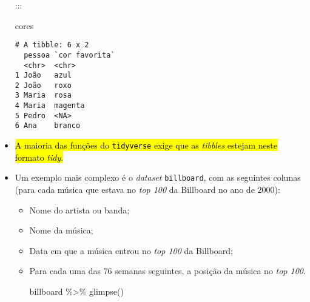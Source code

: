 \documentclass[
  letterpaper,
  DIV=11,
  numbers=noendperiod]{scrreprt}
\newenvironment{Shaded}{\begin{snugshade}}{\end{snugshade}}
\newcommand{\FunctionTok}[1]{\textcolor[rgb]{0.28,0.35,0.67}{#1}}
\newcommand{\NormalTok}[1]{\textcolor[rgb]{0.00,0.23,0.31}{#1}}
\newcommand{\SpecialCharTok}[1]{\textcolor[rgb]{0.37,0.37,0.37}{#1}}
\begin{document}
\begin{itemize}
  :::

\begin{Shaded}
\begin{Highlighting}[]
\NormalTok{cores}
\end{Highlighting}
\end{Shaded}

\begin{verbatim}
# A tibble: 6 x 2
  pessoa `cor favorita`
  <chr>  <chr>         
1 João   azul          
2 João   roxo          
3 Maria  rosa          
4 Maria  magenta       
5 Pedro  <NA>          
6 Ana    branco        
\end{verbatim}
\item
  {\hl{A maioria das funções do {\mbox{\texttt{tidyverse}}} exige que as
  \emph{tibbles} estejam neste formato \emph{tidy}.}}
\item
  Um exemplo mais complexo é o \emph{dataset} \texttt{billboard}, com as
  seguintes colunas (para cada música que estava no \emph{top 100} da
  Billboard no ano de $2000$):

  \begin{itemize}
  \item
    Nome do artista ou banda;
  \item
    Nome da música;
  \item
    Data em que a música entrou no \emph{top 100} da Billboard;
  \item
    Para cada uma das $76$ semanas seguintes, a posição da música no
    \emph{top 100}.

\begin{Shaded}
\begin{Highlighting}[]
\NormalTok{billboard }\SpecialCharTok{\%\textgreater{}\%} \FunctionTok{glimpse}\NormalTok{()}
\end{Highlighting}
\end{Shaded}


\end{itemize}
\end{itemize}
\end{document}
